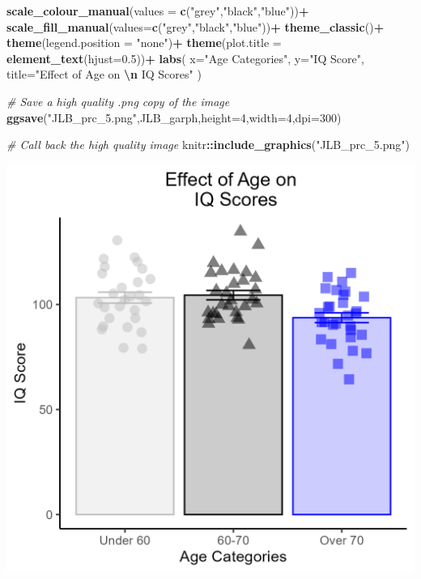 \documentclass[
]{book}
\newenvironment{Shaded}{\begin{snugshade}}{\end{snugshade}}
\newcommand{\AttributeTok}[1]{\textcolor[rgb]{0.13,0.29,0.53}{#1}}
\newcommand{\CommentTok}[1]{\textcolor[rgb]{0.56,0.35,0.01}{\textit{#1}}}
\newcommand{\DecValTok}[1]{\textcolor[rgb]{0.00,0.00,0.81}{#1}}
\newcommand{\FloatTok}[1]{\textcolor[rgb]{0.00,0.00,0.81}{#1}}
\newcommand{\FunctionTok}[1]{\textcolor[rgb]{0.13,0.29,0.53}{\textbf{#1}}}
\newcommand{\NormalTok}[1]{#1}
\newcommand{\SpecialCharTok}[1]{\textcolor[rgb]{0.81,0.36,0.00}{\textbf{#1}}}
\newcommand{\StringTok}[1]{\textcolor[rgb]{0.31,0.60,0.02}{#1}}
\begin{document}
\begin{Shaded}
\begin{Highlighting}[]
  \FunctionTok{scale\_colour\_manual}\NormalTok{(}\AttributeTok{values =} \FunctionTok{c}\NormalTok{(}\StringTok{"grey"}\NormalTok{,}\StringTok{"black"}\NormalTok{,}\StringTok{"blue"}\NormalTok{))}\SpecialCharTok{+}
  \FunctionTok{scale\_fill\_manual}\NormalTok{(}\AttributeTok{values=}\FunctionTok{c}\NormalTok{(}\StringTok{"grey"}\NormalTok{,}\StringTok{"black"}\NormalTok{,}\StringTok{"blue"}\NormalTok{))}\SpecialCharTok{+}
  \FunctionTok{theme\_classic}\NormalTok{()}\SpecialCharTok{+}
  \FunctionTok{theme}\NormalTok{(}\AttributeTok{legend.position =} \StringTok{"none"}\NormalTok{)}\SpecialCharTok{+}
  \FunctionTok{theme}\NormalTok{(}\AttributeTok{plot.title =} \FunctionTok{element\_text}\NormalTok{(}\AttributeTok{hjust=}\FloatTok{0.5}\NormalTok{))}\SpecialCharTok{+}
  \FunctionTok{labs}\NormalTok{(}
    \AttributeTok{x=}\StringTok{"Age Categories"}\NormalTok{,}
    \AttributeTok{y=}\StringTok{"IQ Score"}\NormalTok{,}
    \AttributeTok{title=}\StringTok{"Effect of Age on }\SpecialCharTok{\textbackslash{}n}\StringTok{ IQ Scores"}
\NormalTok{  )}

\CommentTok{\# Save a high quality .png copy of the image}
\FunctionTok{ggsave}\NormalTok{(}\StringTok{"JLB\_prc\_5.png"}\NormalTok{,JLB\_garph,}\AttributeTok{height=}\DecValTok{4}\NormalTok{,}\AttributeTok{width=}\DecValTok{4}\NormalTok{,}\AttributeTok{dpi=}\DecValTok{300}\NormalTok{)}

\CommentTok{\# Call back the high quality image}
\NormalTok{knitr}\SpecialCharTok{::}\FunctionTok{include\_graphics}\NormalTok{(}\StringTok{"JLB\_prc\_5.png"}\NormalTok{)}
\end{Highlighting}
\end{Shaded}

\includegraphics[width=16.67in]{JLB_prc_5}
\end{document}
